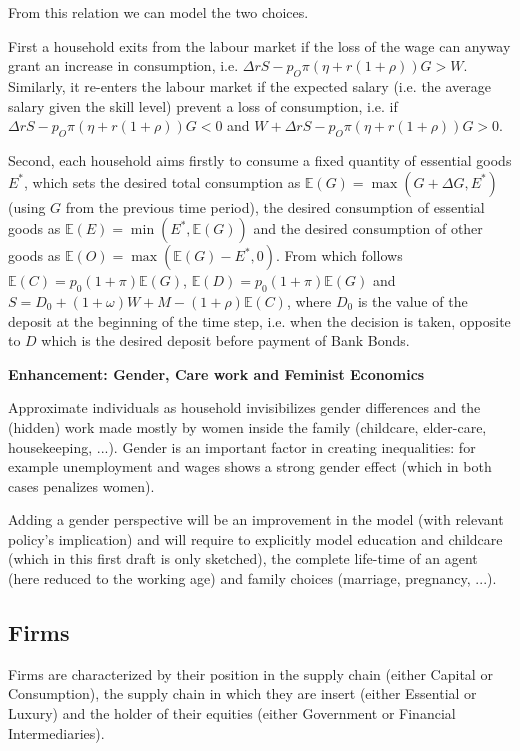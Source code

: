\documentclass[a4paper, headings=standardclasses]{scrartcl}
\newenvironment{enh}[1][]{\begin{framed}\noindent\textbf{Enhancement: #1}\par}{\end{framed}}
\begin{document}
From this relation we can model the two choices.

First a household exits from the labour market if the loss of the wage can anyway grant an increase in consumption, i.e. $\Delta r S - p_O \pi (\eta + r (1+\rho)) G > W$. Similarly, it re-enters the labour market if the expected salary (i.e. the average salary given the skill level) prevent a loss of consumption, i.e. if $\Delta r S - p_O \pi (\eta + r (1+\rho)) G < 0$ and $W + \Delta r S - p_O \pi (\eta + r (1+\rho)) G > 0$.

Second, each household aims firstly to consume a fixed quantity of essential goods $E^*$, which sets the desired total consumption as $\mathbb{E}(G) = \max(G + \Delta G, E^*)$ (using $G$ from the previous time period), the desired consumption of essential goods as $\mathbb{E}(E) = \min(E^*, \mathbb{E}(G))$ and the desired consumption of other goods as $\mathbb{E}(O) = \max(\mathbb{E}(G) - E^*, 0)$. From which follows $\mathbb{E}(C) = p_0 (1+\pi) \mathbb{E}(G)$, $\mathbb{E}(D) = p_0 (1+\pi) \mathbb{E}(G)$ and $S = D_0 + (1+\omega) W + M - (1+\rho) \mathbb{E}(C)$, where $D_0$ is the value of the deposit at the beginning of the time step, i.e. when the decision is taken, opposite to $D$ which is the desired deposit before payment of Bank Bonds.



\begin{enh}[Gender, Care work and Feminist Economics]
	Approximate individuals as household invisibilizes gender differences and the (hidden) work made mostly by women inside the family (childcare, elder-care, housekeeping, ...).
	Gender is an important factor in creating inequalities: for example unemployment and wages shows a strong gender effect (which in both cases penalizes women).

	Adding a gender perspective will be an improvement in the model (with relevant policy's implication) and will require to explicitly model education and childcare (which in this first draft is only sketched), the complete life-time of an agent (here reduced to the working age) and family choices (marriage, pregnancy, ...).
\end{enh}

\subsection{Firms}
Firms are characterized by their position in the supply chain (either Capital or Consumption), the supply chain in which they are insert (either Essential or Luxury) and the holder of their equities (either Government or Financial Intermediaries).
\end{document}
